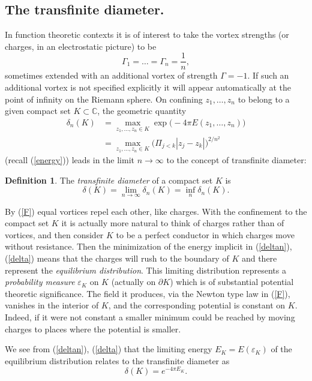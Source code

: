 \documentclass[reqno,12pt]{article}
\theoremstyle{plain}
\theoremstyle{definition}
\newtheorem{definition}{Definition}[section]
\numberwithin{equation}{section}
\numberwithin{figure}{section}
\def\C{{\mathbb C}}
\begin{document}

\subsection{The transfinite diameter.}\label{sec:transfinite diameter}

In function theoretic contexts it is of interest to take the vortex strengths (or charges, in an electrostatic picture) to be
$$
\Gamma_1=\dots =\Gamma_n=\frac{1}{n},
$$  
sometimes extended with an additional vortex of strength $\Gamma=-1$. If such an additional vortex
is not specified explicitly it will appear automatically at the point of infinity on the Riemann sphere.
On confining $z_1,\dots, z_n$ to belong to a given compact set $K\subset \C$, the geometric quantity
\begin{align}\label{deltan}
\delta_n(K)&=\max_{z_1,\dots,z_n\in K}\exp\big(-4\pi E(z_1,\dots, z_n)\big)\\
&=\max_{z_1,\dots,z_n\in K}\Big(\Pi_{j<k}|z_j-z_k|\Big)^{2/n^2}
\end{align}
(recall (\ref{energy})) leads in the limit $n\to\infty$ to the concept of transfinite diameter:
\begin{definition}
The {\it transfinite diameter} of a compact set  $K$ is
\begin{equation}\label{delta}
\delta(K)=\lim_{n\to \infty}\delta_n(K)=\inf_n \delta_n(K).
\end{equation}
\end{definition}
 
By (\ref{F}) equal vortices repel each other, like charges. With the confinement to the
compact set $K$ it is actually more natural to think of charges rather than of vortices, and
then consider $K$ to be a perfect conductor in which charges move without resistance. 
Then the minimization of the energy implicit in (\ref{deltan}), (\ref{delta}) means that the charges will rush to the boundary
of $K$ and there represent the {\it equilibrium distribution}. This limiting distribution represents a 
{\it probability measure} $\varepsilon_K$ on $K$ (actually on $\partial K$) which is of substantial potential theoretic significance.
The field it produces, via the Newton type law in (\ref{F}), vanishes in the interior of $K$, and the corresponding
potential is constant on $K$. 
Indeed, if it were not constant a smaller minimum could be reached by moving charges to places where the potential is smaller.

We see from (\ref{deltan}), (\ref{delta}) that the limiting energy $E_K=E(\varepsilon_K)$
of the equilibrium distribution relates to the transfinite diameter as
\begin{equation}\label{deltaEK}
\delta (K)=e^{-4\pi E_K}.
\end{equation}
\end{document}

